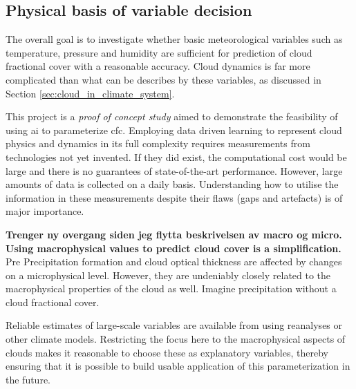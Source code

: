 \subsection{Physical basis of variable decision} \label{sec:ecc}
The overall goal is to investigate whether basic meteorological variables such as temperature, pressure and humidity are sufficient for prediction of cloud fractional cover with a reasonable accuracy. Cloud dynamics is far more complicated than what can be describes by these variables, as discussed in Section \ref{sec:cloud_in_climate_system}.

This project is a \textit{proof of concept study} aimed to demonstrate the feasibility of using \acrshort{ai} to parameterize \acrshort{cfc}. Employing data driven learning to represent cloud physics and dynamics in its full complexity requires measurements from technologies not yet invented. If they did exist, the computational cost would be large and there is no guarantees of state-of-the-art performance. However, large amounts of data is collected on a daily basis. Understanding how to utilise the information in these measurements despite their flaws (gaps and artefacts) is of major importance. 

\textbf{Trenger ny overgang siden jeg flytta beskrivelsen av macro og micro. Using macrophysical values to predict cloud cover is a simplification.}
Pre
Precipitation formation and cloud optical thickness are affected by changes on a microphysical level. However, they are undeniably closely related to the macrophysical properties of the cloud as well. Imagine precipitation without a cloud fractional cover. 

Reliable estimates of large-scale variables are available from using reanalyses or other climate models. Restricting the focus here to the macrophysical aspects of clouds makes it reasonable to choose these as explanatory variables, thereby ensuring that it is possible to build usable application of this parameterization in the future.

